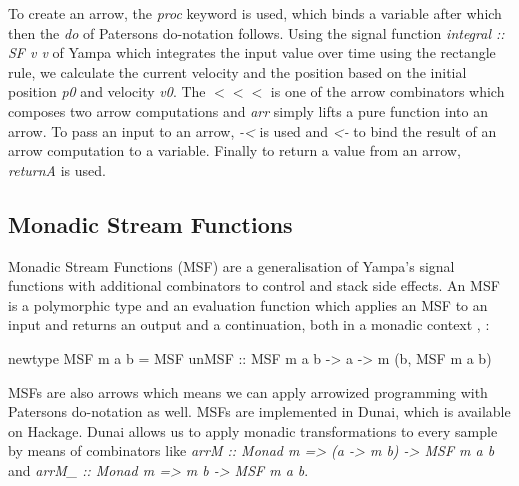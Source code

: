 To create an arrow, the \textit{proc} keyword is used, which binds a variable after which then the \textit{do} of Patersons do-notation \cite{paterson_new_2001} follows. Using the signal function \textit{integral :: SF v v} of Yampa which integrates the input value over time using the rectangle rule, we calculate the current velocity and the position based on the initial position \textit{p0} and velocity \textit{v0}. The $<<<$ is one of the arrow combinators which composes two arrow computations and \textit{arr} simply lifts a pure function into an arrow. To pass an input to an arrow, \textit{-<} is used and \textit{<-} to bind the result of an arrow computation to a variable. Finally to return a value from an arrow, \textit{returnA} is used.

\subsection{Monadic Stream Functions}
Monadic Stream Functions (MSF) are a generalisation of Yampa's signal functions with additional combinators to control and stack side effects. An MSF is a polymorphic type and an evaluation function which applies an MSF to an input and returns an output and a continuation, both in a monadic context \cite{perez_functional_2016}, \cite{perez_extensible_2017}:
\begin{HaskellCode}
newtype MSF m a b =
  MSF { unMSF :: MSF m a b -> a -> m (b, MSF m a b) }
\end{HaskellCode}

MSFs are also arrows which means we can apply arrowized programming with Patersons do-notation as well. MSFs are implemented in Dunai, which is available on Hackage. Dunai allows us to apply monadic transformations to every sample by means of combinators like \textit{arrM :: Monad m => (a -> m b) -> MSF m a b} and \textit{arrM\_ :: Monad m => m b -> MSF m a b}.